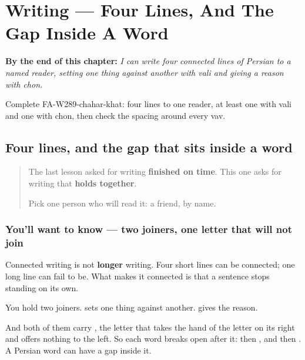 
\chapter{Writing --- Four Lines, And The Gap Inside A Word}
\label{ch:fa-four-lines}

\begin{chapteropening}
\textbf{By the end of this chapter:} \emph{I can write four connected lines of Persian to a named reader, setting one thing against another with vali and giving a reason with chon.}

Complete FA-W289-chahar-khat: four lines to one reader, at least one with vali and one with chon, then check the spacing around every vav.
\end{chapteropening}

\section[(four connected lines)]{Four lines, and the gap that sits inside a word}

\label{lesson:FA-W289-chahar-khat}



\begin{quote}
The last lesson asked for writing \textbf{finished on time}. This one asks for writing that \textbf{holds together}.

Pick one person who will read it: a friend, by name.
\end{quote}

\subsection*{You'll want to know — two joiners, one letter that will not join}
Connected writing is not \textbf{longer} writing. Four short lines can be connected; one long line can fail to be. What makes it connected is that a sentence stops standing on its own.

You hold two joiners. \textbf{} sets one thing against another. \textbf{} gives the reason.

And both of them carry \textbf{}, the letter that takes the hand of the letter on its right and offers nothing to the left. So each word breaks open after it: \textbf{} then \textbf{}, and \textbf{} then \textbf{}. A Persian word can have a gap inside it.

